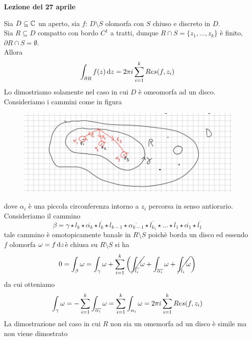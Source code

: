 

\textbf{Lezione del 27 aprile}
\begin{thm}\bianco
Sia $D\subseteq \mathbb{C}$ un aperto, sia $f:\, D \setminus S $ olomorfa con $S$ chiuso e discreto in $D$.\\
Sia $R\subseteq D$ compatto con bordo $C^1$ a tratti, dunque  $R\cap S=\{ z_1, \dots, z_k\}$ \`e finito,   $\partial R \cap S =\emptyset$.\\
Allora 
$$\int_{\partial R} f(z) \, \mathrm{d}z =2\pi  i\sum_{i=1}^k Res(f,z_i)$$
\proof Lo dimostriamo solamente nel caso in cui $D$ \`e omeomorfa ad un disco.\\
Consideriamo i cammini come in figura
\begin{figure}[!h]
\centering
\includegraphics[scale=0.5]{Figure/04_27}
\end{figure}
dove $\alpha_i$ \`e una piccola circonferenza intorno a $z_i$ percorsa in senso antiorario.\\
Consideriamo il cammino
$$ \beta  =\gamma\star l_k \star \overline{\alpha_k}\star \overline{l_k} \star l_{k-1}\star \overline{\alpha_{k-1}} \star \overline{l_{k_1}} \star \dots \star l_1 \star \overline{\alpha_1}\star \overline{l_1}$$
tale cammino \`e omotopicamente banale in $R \setminus S $ poich\`e borda un disco ed essendo $f$ olomorfa $\omega=f\, \mathrm{d}z  $\`e chiusa su $R\setminus S$  si ha 
$$ 0=\int_\beta \omega = \int_\gamma \omega +\sum_{i=1}^k \left(  \cancel{\int_{\overline{l_i}} \omega } + \int_{\overline{\alpha_i}} \omega +\cancel{\int_{l_i} \omega }  \right)$$ 
da cui otteniamo 
$$ \int_\gamma \omega = -\sum_{i=1}^k \int_{\overline{\alpha_i}}\omega =\sum_{i=1}^k \int_{\alpha_i} \omega = 2\pi i \sum_{i=1}^k Res(f,z_i)$$
La dimostrazione nel caso in cui $R$ non sia un omemorfa ad un disco \`e simile ma non viene dimostrato
\end{thm}
